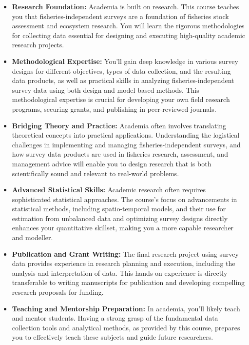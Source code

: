 \documentclass[
  letterpaper,
  oneside,
  open=any]{scrbook}
\providecommand{\tightlist}{%
  \setlength{\itemsep}{0pt}\setlength{\parskip}{0pt}}\usepackage{longtable,booktabs,array}
\begin{document}
\begin{itemize}
\tightlist
\item
  \textbf{Research Foundation:} Academia is built on research. This
  course teaches you that fisheries-independent surveys are a foundation
  of fisheries stock assessment and ecosystem research. You will learn
  the rigorous methodologies for collecting data essential for designing
  and executing high-quality academic research projects.
\item
  \textbf{Methodological Expertise:} You'll gain deep knowledge in
  various survey designs for different objectives, types of data
  collection, and the resulting data products, as well as practical
  skills in analyzing fisheries-independent survey data using both
  design and model-based methods. This methodological expertise is
  crucial for developing your own field research programs, securing
  grants, and publishing in peer-reviewed journals.
\item
  \textbf{Bridging Theory and Practice:} Academia often involves
  translating theoretical concepts into practical applications.
  Understanding the logistical challenges in implementing and managing
  fisheries-independent surveys, and how survey data products are used
  in fisheries research, assessment, and management advice will enable
  you to design research that is both scientifically sound and relevant
  to real-world problems.
\item
  \textbf{Advanced Statistical Skills:} Academic research often requires
  sophisticated statistical approaches. The course's focus on
  advancements in statistical methods, including spatio-temporal models,
  and their use for estimation from unbalanced data and optimizing
  survey designs directly enhances your quantitative skillset, making
  you a more capable researcher and modeller.
\item
  \textbf{Publication and Grant Writing:} The final research project
  using survey data provides experience in research planning and
  execution, including the analysis and interpretation of data. This
  hands-on experience is directly transferable to writing manuscripts
  for publication and developing compelling research proposals for
  funding.
\item
  \textbf{Teaching and Mentorship Preparation:} In academia, you'll
  likely teach and mentor students. Having a strong grasp of the
  fundamental data collection tools and analytical methods, as provided
  by this course, prepares you to effectively teach these subjects and
  guide future researchers.

\end{itemize}
\end{document}
